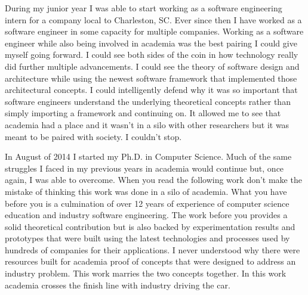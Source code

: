 During my junior year I was able to start working as a software engineering intern for a company local to Charleston, SC. Ever since then I have worked as a software engineer in some capacity for multiple companies. Working as a software engineer while also being involved in academia was the best pairing I could give myself going forward. I could see both sides of the coin in how technology really did further multiple advancements. I could see the theory of software design and architecture while using the newest software framework that implemented those architectural concepts. I could intelligently defend why it was so important that software engineers understand the underlying theoretical concepts rather than simply importing a framework and continuing on. It allowed me to see that academia had a place and it wasn't in a silo with other researchers but it was meant to be paired with society. I couldn't stop.

In August of 2014 I started my Ph.D. in Computer Science. Much of the same struggles I faced in my previous years in academia would continue but, once again, I was able to overcome. When you read the following work don't make the mistake of thinking this work was done in a silo of academia. What you have before you is a culmination of over 12 years of experience of computer science education and industry software engineering. The work before you provides a solid theoretical contribution but is also backed by experimentation results and prototypes that were built using the latest technologies and processes used by hundreds of companies for their applications. I never understood why there were resources built for academia proof of concepts that were designed to address an industry problem. This work marries the two concepts together. In this work academia crosses the finish line with industry driving the car.